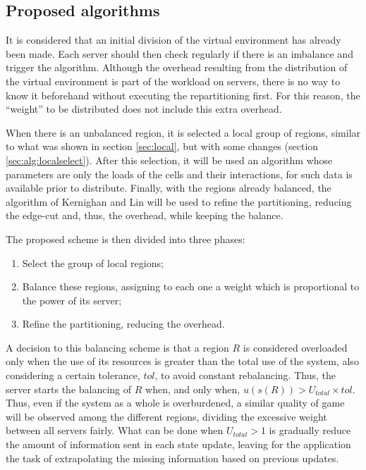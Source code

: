 \subsection{Proposed algorithms}
\label{sec:alg}
	
It is considered that an initial division of the virtual environment has already been made. Each server should then check regularly if there is an imbalance and trigger the algorithm. Although the overhead resulting from the distribution of the virtual environment is part of the workload on servers, there is no way to know it beforehand without executing the repartitioning first. For this reason, the ``weight'' to be distributed does not include this extra overhead.

When there is an unbalanced region, it is selected a local group of regions, similar to what was shown in section \ref{sec:local}, but with some changes (section \ref{sec:alg:localselect}). After this selection, it will be used an algorithm whose parameters are only the loads of the cells and their interactions, for such data is available prior to distribute. Finally, with the regions already balanced, the algorithm of Kernighan and Lin \cite{kernighan1970ehp} will be used to refine the partitioning, reducing the edge-cut and, thus, the overhead, while keeping the balance.

The proposed scheme is then divided into three phases:

\begin{enumerate}
	\item Select the group of local regions;
	\item Balance these regions, assigning to each one a weight which is proportional to the power of its server;
	\item Refine the partitioning, reducing the overhead.
\end{enumerate}

A decision to this balancing scheme is that a region $R$ is considered overloaded only when the use of its resources is greater than the total use of the system, also considering a certain tolerance, $tol$, to avoid constant rebalancing. Thus, the server starts the balancing of $R$ when, and only when, $u(s(R)) > U_{total} \times tol$. Thus, even if the system as a whole is overburdened, a similar quality of game will be observed among the different regions, dividing the excessive weight between all servers fairly. What can be done when $U_{total} > 1$ is gradually reduce the amount of information sent in each state update, leaving for the application the task of extrapolating the missing information based on previous updates.

